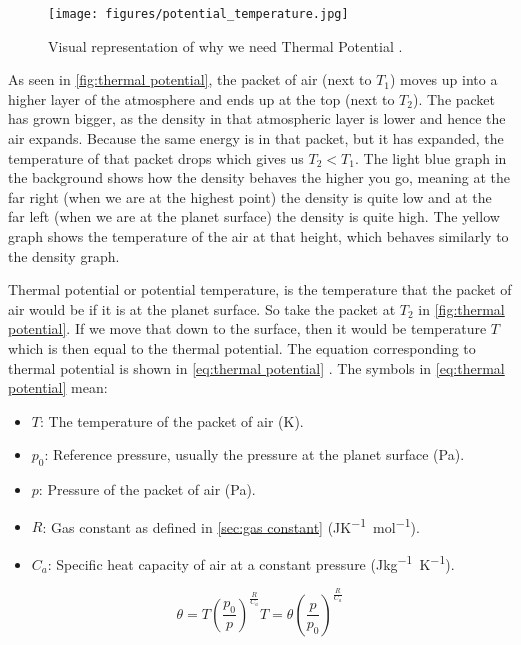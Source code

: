 \begin{figure}
    \label{fig:thermal potential}
    \centering
    \texttt{[image: figures/potential\_temperature.jpg]}
    \caption{Visual representation of why we need Thermal Potential \cite{simon}.}
\end{figure}

As seen in \autoref{fig:thermal potential}, the packet of air (next to $T_1$) moves up into a higher layer of the atmosphere and ends up at the top (next to $T_2$). The packet has grown bigger, 
as the density in that atmospheric layer is lower and hence the air expands. Because the same energy is in that packet, but it has expanded, the temperature of that packet drops which gives us 
$T_2 < T_1$. The light blue graph in the background shows how the density behaves the higher you go, meaning at the far right (when we are at the highest point) the density is quite low and at 
the far left (when we are at the planet surface) the density is quite high. The yellow graph shows the temperature of the air at that height, which behaves similarly to the density graph.

Thermal potential or potential temperature, is the temperature that the packet of air would be if it is at the planet surface. So take the packet at $T_2$ in \autoref{fig:thermal potential}. If we move that down to the 
surface, then it would be temperature $T$ which is then equal to the thermal potential. The equation corresponding to thermal potential is shown in \autoref{eq:thermal potential} 
\cite{thermalPotential}. The symbols in \autoref{eq:thermal potential} mean:

\begin{itemize}
    \item $T$: The temperature of the packet of air (\si{K}).
    \item $p_0$: Reference pressure, usually the pressure at the planet surface (\si{Pa}).
    \item $p$: Pressure of the packet of air (\si{Pa}).
    \item $R$: Gas constant as defined in \autoref{sec:gas constant} (\si{JK^{-1}mol^{-1}}).
    \item $C_a$: Specific heat capacity of air at a constant pressure (\si{Jkg^{-1}K^{-1}}).
\end{itemize}

\begin{subequations}
    \begin{equation}
        \label{eq:thermal potential}
        \theta = T(\frac{p_0}{p})^{\frac{R}{C_a}}
    \end{equation}
    \begin{equation}
        \label{eq:potential temp}
        T = \theta(\frac{p}{p_0})^{\frac{R}{C_a}}
    \end{equation}
\end{subequations}

